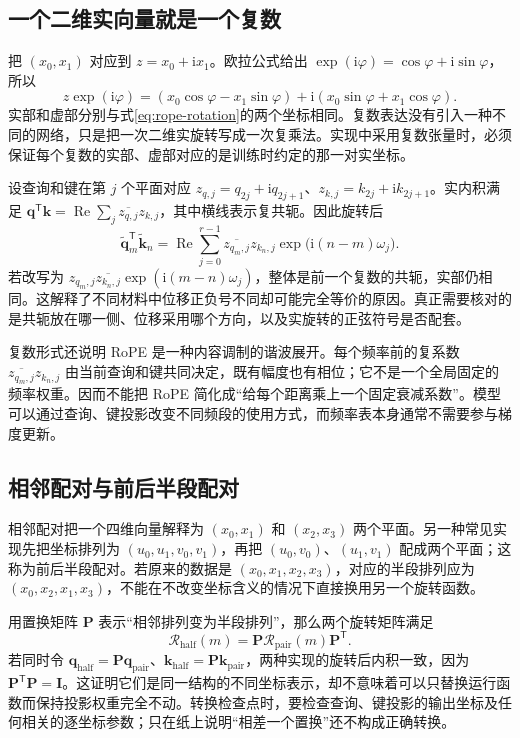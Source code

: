 \documentclass[UTF8,12pt,a4paper,fontset=fandol]{ctexart}
\begin{document}
\subsection{一个二维实向量就是一个复数}
把 $(x_0,x_1)$ 对应到 $z=x_0+\mathrm i x_1$。欧拉公式给出 $\exp(\mathrm i\varphi)=\cos\varphi+\mathrm i\sin\varphi$，所以
\[
z\exp(\mathrm i\varphi)
=(x_0\cos\varphi-x_1\sin\varphi)
+\mathrm i(x_0\sin\varphi+x_1\cos\varphi).
\]
实部和虚部分别与式\eqref{eq:rope-rotation}的两个坐标相同。复数表达没有引入一种不同的网络，只是把一次二维实旋转写成一次复乘法。实现中采用复数张量时，必须保证每个复数的实部、虚部对应的是训练时约定的那一对实坐标。

设查询和键在第 $j$ 个平面对应 $z_{q,j}=q_{2j}+\mathrm i q_{2j+1}$、$z_{k,j}=k_{2j}+\mathrm i k_{2j+1}$。实内积满足 $\mathbf q^{\mathsf T}\mathbf k=\operatorname{Re}\sum_j\overline{z_{q,j}}z_{k,j}$，其中横线表示复共轭。因此旋转后
\begin{equation}
\widetilde{\mathbf q}_m^{\mathsf T}\widetilde{\mathbf k}_n
=\operatorname{Re}\sum_{j=0}^{r-1}
\overline{z_{q_m,j}}z_{k_n,j}\exp\bigl(\mathrm i(n-m)\omega_j\bigr).
\label{eq:rope-complex}
\end{equation}
若改写为 $z_{q_m,j}\overline{z_{k_n,j}}\exp(\mathrm i(m-n)\omega_j)$，整体是前一个复数的共轭，实部仍相同。这解释了不同材料中位移正负号不同却可能完全等价的原因。真正需要核对的是共轭放在哪一侧、位移采用哪个方向，以及实旋转的正弦符号是否配套。

复数形式还说明 RoPE 是一种内容调制的谐波展开。每个频率前的复系数 $\overline{z_{q_m,j}}z_{k_n,j}$ 由当前查询和键共同决定，既有幅度也有相位；它不是一个全局固定的频率权重。因而不能把 RoPE 简化成“给每个距离乘上一个固定衰减系数”。模型可以通过查询、键投影改变不同频段的使用方式，而频率表本身通常不需要参与梯度更新。

\subsection{相邻配对与前后半段配对}
相邻配对把一个四维向量解释为 $(x_0,x_1)$ 和 $(x_2,x_3)$ 两个平面。另一种常见实现先把坐标排列为 $(u_0,u_1,v_0,v_1)$，再把 $(u_0,v_0)$、$(u_1,v_1)$ 配成两个平面；这称为前后半段配对。若原来的数据是 $(x_0,x_1,x_2,x_3)$，对应的半段排列应为 $(x_0,x_2,x_1,x_3)$，不能在不改变坐标含义的情况下直接换用另一个旋转函数。

用置换矩阵 $\mathbf P$ 表示“相邻排列变为半段排列”，那么两个旋转矩阵满足
\begin{equation}
\mathcal R_{\mathrm{half}}(m)
=\mathbf P\mathcal R_{\mathrm{pair}}(m)\mathbf P^{\mathsf T}.
\label{eq:rope-layout}
\end{equation}
若同时令 $\mathbf q_{\mathrm{half}}=\mathbf P\mathbf q_{\mathrm{pair}}$、$\mathbf k_{\mathrm{half}}=\mathbf P\mathbf k_{\mathrm{pair}}$，两种实现的旋转后内积一致，因为 $\mathbf P^{\mathsf T}\mathbf P=\mathbf I$。这证明它们是同一结构的不同坐标表示，却不意味着可以只替换运行函数而保持投影权重完全不动。转换检查点时，要检查查询、键投影的输出坐标及任何相关的逐坐标参数；只在纸上说明“相差一个置换”还不构成正确转换。
\end{document}
